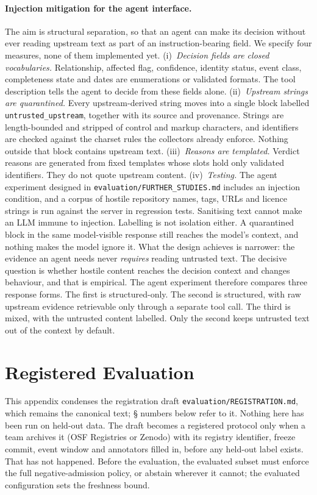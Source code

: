 \documentclass[11pt,a4paper]{article}
\newcommand{\code}[1]{\texttt{#1}}
\begin{document}
\paragraph{Injection mitigation for the agent interface.} The aim is
structural separation, so that an agent can make its decision without ever
reading upstream text as part of an instruction-bearing field. We
specify four measures, none of them implemented yet.
(i)~\emph{Decision fields are closed vocabularies.} Relationship,
affected flag, confidence, identity status, event class, completeness
state and dates are enumerations or validated formats. The tool
description tells the agent to decide from these fields alone.
(ii)~\emph{Upstream strings are quarantined.} Every upstream-derived
string moves into a single block labelled \code{untrusted\_upstream},
together with its source and provenance. Strings are length-bounded and
stripped of control and markup characters, and identifiers are checked
against the charset rules the collectors already enforce. Nothing
outside that block contains upstream text.
(iii)~\emph{Reasons are templated.} Verdict reasons are generated from
fixed templates whose slots hold only validated identifiers. They do
not quote upstream content.
(iv)~\emph{Testing.} The agent experiment designed in
\code{evaluation/FURTHER\_STUDIES.md} includes an injection condition, and a corpus of hostile repository
names, tags, URLs and licence strings is run against the server in
regression tests.
Sanitising text cannot make an LLM immune to injection. Labelling is
not isolation either. A quarantined block in the same model-visible
response still reaches the model's context, and nothing makes the
model ignore it. What the design achieves is narrower: the evidence an
agent needs never \emph{requires} reading untrusted text. The decisive
question is whether hostile content reaches the decision context and
changes behaviour, and that is empirical. The agent experiment
therefore compares three response forms. The first is structured-only.
The second is structured, with raw upstream evidence retrievable only
through a separate tool call. The third is mixed, with the untrusted
content labelled. Only the second keeps untrusted text out of the
context by default.

\section{Registered Evaluation}
\label{app:protocol}
This appendix condenses the registration draft
\code{evaluation/REGISTRATION.md}, which remains the canonical text;
\S{} numbers below refer to it. Nothing here has been run on held-out
data. The draft becomes a registered protocol only when a team archives
it (OSF Registries or Zenodo) with its registry identifier, freeze
commit, event window and annotators filled in, before any held-out
label exists. That has not happened. Before the evaluation, the
evaluated subset must enforce the full negative-admission policy, or
abstain wherever it cannot; the evaluated configuration sets the
freshness bound.
\end{document}

